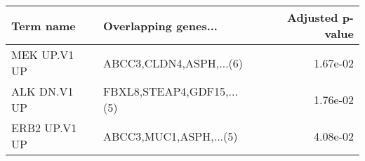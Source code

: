 \begin{tabular}{llr}
\toprule
    Term name &      Overlapping genes... &  Adjusted p-value \\
\midrule
 MEK UP.V1 UP &   ABCC3,CLDN4,ASPH,...(6) &          1.67e-02 \\
 ALK DN.V1 UP & FBXL8,STEAP4,GDF15,...(5) &          1.76e-02 \\
ERB2 UP.V1 UP &    ABCC3,MUC1,ASPH,...(5) &          4.08e-02 \\
\bottomrule
\end{tabular}
